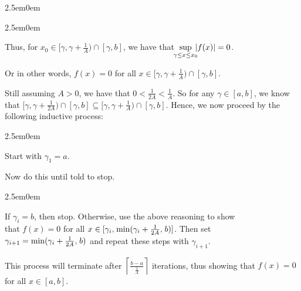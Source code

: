 \documentclass{book}
\newenvironment{myIndent}{%
   \begin{adjustwidth}{2.5em}{0em}%
}{%
   \end{adjustwidth}%
}
\newcommand{\retTwo}{\hfill\bigbreak}
\begin{document}
{\begin{myIndent}
\begin{myIndent}
      Thus, for $x_0 \in [\gamma, \gamma + \frac{1}{A}) \cap [\gamma, b]$, we have that $\hspace{-0.5em}\sup\limits_{\gamma\leq x\leq x_0}\hspace{-0.5em}|f(x)| = 0$.\retTwo

      Or in other words, $f(x) = 0$ for all $x \in [\gamma, \gamma + \frac{1}{A}) \cap [\gamma, b]$.\retTwo
   \end{myIndent}

   Still assuming $A > 0$, we have that $0 < \frac{1}{2A} < \frac{1}{A}$. So for any $\gamma \in [a, b]$, we know\\ [2pt] that $[\gamma, \gamma + \frac{1}{2A}) \cap [\gamma, b] \subseteq [\gamma, \gamma + \frac{1}{A}) \cap [\gamma, b]$. Hence, we now proceed by the\\ [2pt] following inductive process:

   \begin{myIndent}
      Start with $\gamma_1 = a$.

      Now do this until told to stop.
      \begin{myIndent}
         If $\gamma_i = b$, then stop. Otherwise, use the above reasoning to show\\ that $f(x) = 0$ for all $x \in [\gamma_i,\hspace{0.1em} \min(\gamma_i + \frac{1}{2A},\hspace{0.1em} b)]$. Then set\\ $\gamma_{i+1} = \min(\gamma_i + \frac{1}{2A},\hspace{0.1em} b)$ and repeat these steps with $\gamma_{i+1}$.\retTwo
      \end{myIndent}
   \end{myIndent}

   This process will terminate after $\left\lceil \frac{b - a}{\frac{1}{A}}\right\rceil$ iterations, thus showing that $f(x) = 0$\\ for all $x \in [a, b]$.
   \retTwo
\end{myIndent}}
\end{document}
